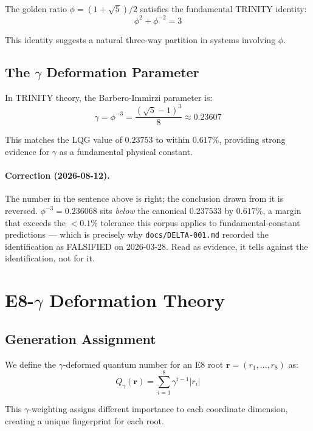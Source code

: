\documentclass[12pt,a4paper]{article}
\begin{document}
The golden ratio $\phi = (1+\sqrt{5})/2$ satisfies the fundamental TRINITY identity:
\begin{equation}
\phi^2 + \phi^{-2} = 3
\end{equation}

This identity suggests a natural three-way partition in systems involving $\phi$.

\subsection{The $\gamma$ Deformation Parameter}

In TRINITY theory, the Barbero-Immirzi parameter is:
\begin{equation}
\gamma = \phi^{-3} = \frac{(\sqrt{5}-1)^3}{8} \approx 0.23607
\end{equation}

This matches the LQG value of $0.23753$ to within $0.617\%$, providing strong evidence for $\gamma$ as a fundamental physical constant.

\paragraph{Correction (2026-08-12).} The number in the sentence above is right; the conclusion drawn from it is reversed. $\phi^{-3} = 0.236068$ sits \emph{below} the canonical $0.237533$ by $0.617\%$, a margin that exceeds the $<0.1\%$ tolerance this corpus applies to fundamental-constant predictions --- which is precisely why \texttt{docs/DELTA-001.md} recorded the identification as FALSIFIED on 2026-03-28. Read as evidence, it tells against the identification, not for it.

\section{E8-$\gamma$ Deformation Theory}

\subsection{Generation Assignment}

We define the $\gamma$-deformed quantum number for an E8 root $\bm{r} = (r_1, \ldots, r_8)$ as:
\begin{equation}
Q_\gamma(\bm{r}) = \sum_{i=1}^{8} \gamma^{i-1} |r_i|
\end{equation}

This $\gamma$-weighting assigns different importance to each coordinate dimension, creating a unique fingerprint for each root.
\end{document}
